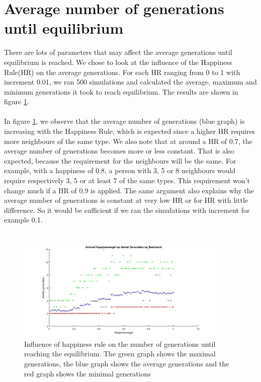 
\section{Average number of generations until equilibrium}
There are lots of parameters that may affect the average generations until  equilibrium is reached. We chose to look at the influence of the Happiness Rule(HR) on the average generations. For each HR ranging from 0 to 1 with increment 0.01, we ran 500 simulations and calculated the average, maximum and minimum generations it took to reach equilibrium. The results are shown in figure \ref{fig:avegen}.\\
\\
In figure \ref{fig:avegen}, we observe that the average number of generations (blue graph) is increasing with the Happiness Rule, which is expected since a higher HR requires more neighbours of the same type. We also note that at around a HR of 0.7, the average number of generations becomes more or less constant. That is also expected, because the requirement for the neighbours will be the same. For example, with a happiness of 0.8, a person with 3, 5 or 8 neighbours would require respectively 3, 5 or at least 7 of the same types. This requirement won't change much if a HR of 0.9 is applied. The same argument also explains why the average number of generations is constant at very low HR or for HR with little difference. So it would be sufficient if we ran the simulations with increment for example 0.1.\\
\\
\begin{figure}[h!]
    \centering
    \includegraphics[width=0.9\textwidth]{happinessregel_aantgen_2}
    \caption{Influence of happiness rule on the number of generations until reaching the equilibrium. The green graph shows the maximal generations, the blue graph shows the average generations and the red graph shows the minimal generations}
    \label{fig:avegen}
\end{figure}
